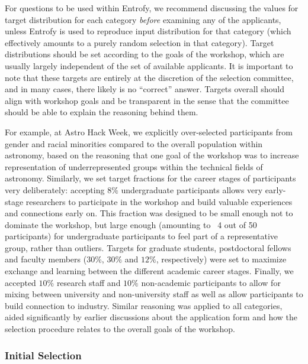 \documentclass[12pt]{article}
\begin{document}
For questions to be used within Entrofy, we recommend discussing the values for target distribution for each category \textit{before} examining any of the applicants, unless Entrofy is used to reproduce input distribution for that category (which effectively amounts to a purely random selection in that category). Target distributions should be set according to the goals of the workshop, which are usually largely independent of the set of available applicants. It is important to note that these targets are entirely at the discretion of the selection committee, and in many cases, there likely is no ``correct'' answer. Targets overall should align with workshop goals and be transparent in the sense that the committee should be able to explain the reasoning behind them. 

For example, at Astro Hack Week, we explicitly over-selected participants from gender and racial minorities compared to the overall population within astronomy, based on the reasoning that one goal of the workshop was to increase representation of underrepresented groups within the technical fields of astronomy. Similarly, we set target fractions for the career stages of participants very deliberately: accepting $8\%$ undergraduate participants allows very early-stage researchers to participate in the workshop and build valuable experiences and connections early on. This fraction was designed to be small enough not to dominate the workshop, but large enough (amounting to ~4 out of 50 participants) for undergraduate participants to feel part of a representative group, rather than outliers. Targets for graduate students, postdoctoral fellows and faculty members ($30\%$, $30\%$ and $12\%$, respectively) were set to maximize exchange and learning between the different academic career stages. Finally, we accepted $10\%$ research staff and $10\%$ non-academic participants to allow for mixing between university and non-university staff as well as allow participants to build connection to industry.
Similar reasoning was applied to all categories, aided significantly by earlier discussions about the application form and how the selection procedure relates to the overall goals of the workshop.

\subsubsection*{Initial Selection}
\end{document}
